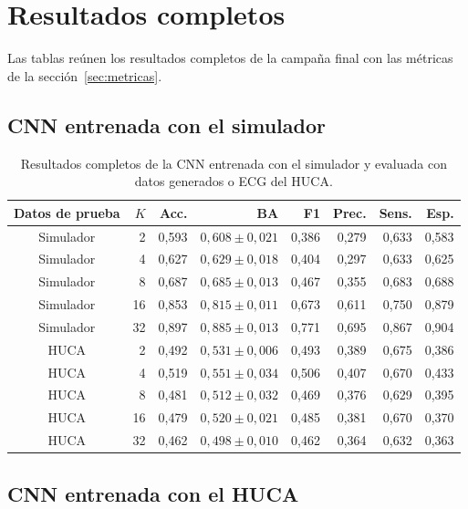 \chapter{Resultados completos}
\label{app:resultados}

Las tablas reúnen los resultados completos de la campaña final con las métricas de la sección~\ref{sec:metricas}.

\section{CNN entrenada con el simulador}

\begin{table}[H]
  \centering
  \small
  \begin{tabular}{crrrrrrr}
    \toprule
    Datos de prueba & \(K\) & Acc. & BA & F1 & Prec. & Sens. & Esp. \\
    \midrule
    Simulador & 2  & 0,593 & \(0,608 \pm 0,021\) & 0,386 & 0,279 & 0,633 & 0,583 \\
    Simulador & 4  & 0,627 & \(0,629 \pm 0,018\) & 0,404 & 0,297 & 0,633 & 0,625 \\
    Simulador & 8  & 0,687 & \(0,685 \pm 0,013\) & 0,467 & 0,355 & 0,683 & 0,688 \\
    Simulador & 16 & 0,853 & \(0,815 \pm 0,011\) & 0,673 & 0,611 & 0,750 & 0,879 \\
    Simulador & 32 & 0,897 & \(0,885 \pm 0,013\) & 0,771 & 0,695 & 0,867 & 0,904 \\
    \midrule
    HUCA & 2  & 0,492 & \(0,531 \pm 0,006\) & 0,493 & 0,389 & 0,675 & 0,386 \\
    HUCA & 4  & 0,519 & \(0,551 \pm 0,034\) & 0,506 & 0,407 & 0,670 & 0,433 \\
    HUCA & 8  & 0,481 & \(0,512 \pm 0,032\) & 0,469 & 0,376 & 0,629 & 0,395 \\
    HUCA & 16 & 0,479 & \(0,520 \pm 0,021\) & 0,485 & 0,381 & 0,670 & 0,370 \\
    HUCA & 32 & 0,462 & \(0,498 \pm 0,010\) & 0,462 & 0,364 & 0,632 & 0,363 \\
    \bottomrule
  \end{tabular}
  \caption{Resultados completos de la CNN entrenada con el simulador y evaluada con datos generados o ECG del HUCA.}
  \label{tab:app_cnn_completo}
  \resultstablenote
\end{table}

\clearpage
\section{CNN entrenada con el HUCA}

